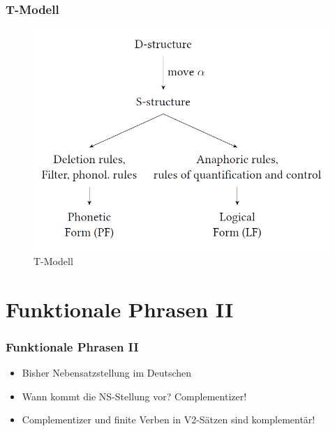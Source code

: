 \begin{frame}
\frametitle{T-Modell}

\begin{figure}
	\includegraphics[scale=.45]{material/11tmodell}
	\caption{T-Modell \citep[vgl.][]{MuellerS15b}}
\end{figure}
	
\end{frame}


\section{Funktionale Phrasen II}

\begin{frame}
\frametitle{Funktionale Phrasen II}

\begin{itemize}
	\item Bisher \ras Nebensatzstellung im Deutschen
	\item Wann kommt die NS-Stellung vor? \ras Complementizer!
	
	\eal
	\zl
	
	\item Complementizer und finite Verben in V2-Sätzen sind komplementär!
	
\end{itemize}

\end{frame}


